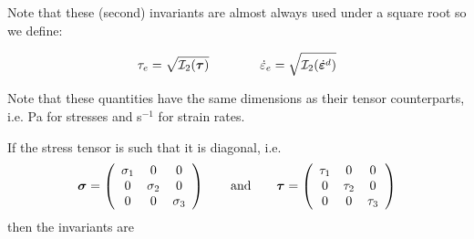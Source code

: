 Note that these (second) invariants are almost always used under a square root so we define:
\begin{mdframed}[backgroundcolor=blue!5]
\[
\tau_{e}=\sqrt{{\cal I}_2({\bm \tau})}
\quad\quad
\quad\quad
\dot{\varepsilon}_{e}=\sqrt{{\cal I}_2(\dot{\bm \varepsilon}^d)}
\]
\end{mdframed}
Note that these quantities have the same dimensions as their tensor counterparts, i.e. Pa for stresses and s$^{-1}$ for strain rates.

If the stress tensor is such that it is diagonal, i.e.
\[
{\bm \sigma}= \left( \begin{array}{ccc}
\sigma_1 & 0 & 0 \\
0 & \sigma_2 & 0 \\
0 & 0 & \sigma_3
\end{array}\right)
\qquad
{\rm and}
\qquad
{\bm \tau}= \left( \begin{array}{ccc}
\tau_1 & 0 & 0 \\
0 & \tau_2 & 0 \\
0 & 0 & \tau_3
\end{array}\right)
\]
then the invariants are 
